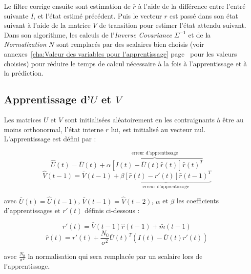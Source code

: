 Le filtre corrige ensuite sont estimation de $\bar{r}$ à l'aide de la
différence entre l'entré suivante $I$, et l'état estimé précédent. Puis le
vecteur $r$ est passé dans son état suivant à l'aide de la matrice $V$ de
transition pour estimer l'état attendu suivant.\\

Dans son algorithme, les calculs de l'\textit{Inverse Covariance} $\Sigma^{-1}$
et de la \textit{Normalization} $N$ sont remplacés par des scalaires bien
choisis (voir annexes~\ref{cha:Valeur des variables pour l'apprentissage}
page~\pageref{cha:Valeur des variables pour l'apprentissage} pour les valeurs
choisies) pour réduire le temps de calcul nécessaire à la fois à
l'apprentissage et à la prédiction.


\subsection{Apprentissage d'$U$ et $V$} %
\label{sub:Apprentissage de U et V}

Les matrices $U$ et $V$ sont initialisées aléatoirement en les contraignants
à être au moins orthonormal, l'état interne $r$ lui, est initialisé au vecteur
nul. L'apprentissage est défini par :

\begin{equation}
   \label{eqn:learning_U}
   \hat{U}(t) = \bar{U}(t) + \overbrace{\alpha[I(t) - \bar{U}(t)\hat{r}(t)]\hat{r}(t)^T}^\text{erreur d'apprentissage}
\end{equation}
\begin{equation}
   \label{eqn:learning_V}
   \hat{V}(t-1) = \bar{V}(t-1) + \underbrace{\beta[\hat{r}(t) - r'(t)]\hat{r}(t-1)^T}_\text{erreur d'apprentissage}
\end{equation}

avec $\bar{U}(t) = \hat{U}(t-1)$, $\bar{V}(t-1) = \hat{V}(t-2)$, $\alpha$ et
$\beta$ les coefficients d'apprentissages et $r'(t)$ définis ci-dessous :

\begin{equation}
   \label{eqn:def_r_prime}
   r'(t) =  \bar{V}(t-1)\hat{r}(t-1) + \bar{m}(t-1)
\end{equation}
\begin{equation}
   \label{eqn:def_r_hat}
   \hat{r}(t) = r'(t) + \frac{N_0}{\sigma^2}\bar{U}(t)^T(I(t)-\bar{U}(t)r'(t))
\end{equation}

avec $\frac{N_0}{\sigma^2}$ la normalisation qui sera remplacée par un scalaire lors
de l'apprentissage.

